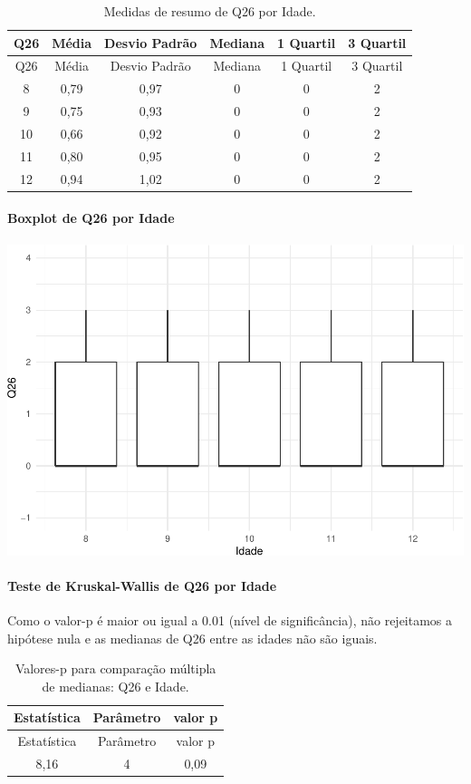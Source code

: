 \documentclass[]{article}
\let\oldparagraph\paragraph
\renewcommand{\paragraph}[1]{\oldparagraph{#1}\mbox{}}
\begin{document}
\begin{longtable}[]{@{}cccccc@{}}
\caption{\label{tab:unnamed-chunk-744}Medidas de resumo de Q26 por Idade.}\tabularnewline
\toprule
Q26 & Média & Desvio Padrão & Mediana & 1 Quartil & 3 Quartil\tabularnewline
\midrule
\endfirsthead
\toprule
Q26 & Média & Desvio Padrão & Mediana & 1 Quartil & 3 Quartil\tabularnewline
\midrule
\endhead
8 & 0,79 & 0,97 & 0 & 0 & 2\tabularnewline
9 & 0,75 & 0,93 & 0 & 0 & 2\tabularnewline
10 & 0,66 & 0,92 & 0 & 0 & 2\tabularnewline
11 & 0,80 & 0,95 & 0 & 0 & 2\tabularnewline
12 & 0,94 & 1,02 & 0 & 0 & 2\tabularnewline
\bottomrule
\end{longtable}

\hypertarget{boxplot-de-q26-por-idade}{%
\paragraph{Boxplot de Q26 por Idade}\label{boxplot-de-q26-por-idade}}

\begin{center}\includegraphics[width=0.75\linewidth]{relatorio_covid19_files/figure-latex/unnamed-chunk-745-1} \end{center}

\hypertarget{teste-de-kruskal-wallis-de-q26-por-idade}{%
\paragraph{Teste de Kruskal-Wallis de Q26 por Idade}\label{teste-de-kruskal-wallis-de-q26-por-idade}}

Como o valor-p é maior ou igual a 0.01 (nível de significância), não rejeitamos a hipótese nula e as medianas de Q26 entre as idades não são iguais.

\begin{longtable}[]{@{}ccc@{}}
\caption{\label{tab:unnamed-chunk-747}Valores-p para comparação múltipla de medianas: Q26 e Idade.}\tabularnewline
\toprule
Estatística & Parâmetro & valor p\tabularnewline
\midrule
\endfirsthead
\toprule
Estatística & Parâmetro & valor p\tabularnewline
\midrule
\endhead
8,16 & 4 & 0,09\tabularnewline
\bottomrule
\end{longtable}
\end{document}
